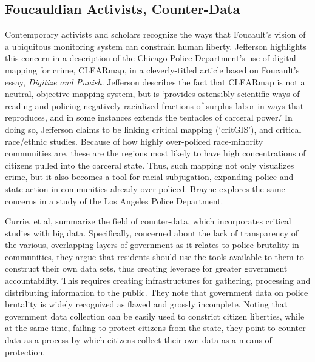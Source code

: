 \documentclass[sigconf]{acmart}
\begin{document}
\subsection{Foucauldian Activists, Counter-Data}
Contemporary activists and scholars recognize the ways that Foucault's vision of a ubiquitous monitoring system can constrain human liberty.  Jefferson highlights this concern in a description of the Chicago Police Department's use of digital mapping for crime, CLEARmap, in a cleverly-titled article based on Foucault's essay, {\em Digitize and Punish}. \cite{jefferson17} Jefferson describes the fact that CLEARmap is not a neutral, objective mapping system, but is `provides ostensibly scientific ways of reading and policing negatively racialized fractions of surplus labor in ways that reproduces, and in some instances extends the tentacles of carceral power.'  In doing so, Jefferson claims to be linking critical mapping (`critGIS'), and critical race/ethnic studies.  Because of how highly over-policed race-minority communities are, these are the regions most likely to have high concentrations of citizens pulled into the carceral state. \cite{gilbert15,brunson05,rios11,crichlow14,payne17,chaney13,schneider14} Thus, such mapping not only visualizes crime, but it also becomes a tool for racial subjugation, expanding police and state action in communities already over-policed.  Brayne explores the same concerns in a study of the Los Angeles Police Department. \cite{brayne17}

Currie, et al, summarize the field of counter-data, which incorporates critical studies with big data. \cite{currie16} Specifically, concerned about the lack of transparency of the various, overlapping layers of government as it relates to police brutality in communities, they argue that residents should use the tools available to them to construct their own data sets, thus creating leverage for greater government accountability.  This requires creating infrastructures for gathering, processing and distributing information to the public.  They note that government data on police brutality is widely recognized as flawed and grossly incomplete. \cite{currie16,patterson16,dalton17}  Noting that government data collection can be easily used to constrict citizen liberties, while at the same time, failing to protect citizens from the state, they point to counter-data as a process by which citizens collect their own data as a means of protection.  
\end{document}
